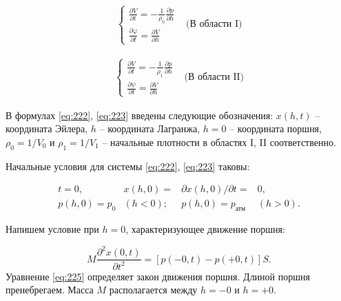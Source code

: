 \documentclass[specialist, subf, href, colorlinks=true, 14pt, final]{disser}
\theoremstyle{definition}
\newcommand{\pdfrac}[2]{\frac{\partial #1}{\partial #2}}
\begin{document}
\addtocounter{equation}{1}
\begin{equation}\label{eq:222}
  \begin{array}{lr}
  \begin{cases}
    \displaystyle \pdfrac{V}{t} = \displaystyle -\frac{1}{\rho_0} \pdfrac{p}{h} \\
    \displaystyle \pdfrac{\varphi}{t} = \displaystyle \pdfrac{V}{h}
  \end{cases}
  &
  \text{(В области I)}
  \end{array}
  \tag{2}
\end{equation}
\addtocounter{equation}{1}
\begin{equation}\label{eq:223}
  \begin{array}{lr}
  \begin{cases}
    \displaystyle \pdfrac{V}{t} = \displaystyle -\frac{1}{\rho_1} \pdfrac{p}{h} \\
    \displaystyle \pdfrac{\psi}{t} = \displaystyle \pdfrac{V}{h}
  \end{cases}
  &
  \text{(В области II)}
  \end{array}
  \tag{3}
\end{equation}


В формулах \eqref{eq:222}, \eqref{eq:223} введены следующие обозначения: $x(h, t)$ -- координата Эйлера, $h$ -- координата Лагранжа, $h=0$ -- координата поршня, $\rho_{0} = 1/V_{0}$ и $\rho_{1} = 1/V_{1}$ -- начальные плотности в областях I, II соответственно.

Начальные условия для системы \eqref{eq:222}, \eqref{eq:223} таковы:
\addtocounter{equation}{1}
\begin{equation}\label{eq:224}
	\begin{array}{llll}
  		t = 0, & x(h,0) = & \partial x (h, 0)/ \partial t = & 0, \\
  		p(h,0) =  p_0 & (h < 0) ; & p(h,0) =  p_{\text{атм}} &(h > 0).
  \end{array}
  \tag{4}
\end{equation}

Напишем условие при $h=0$, характеризующее движение поршня:
\addtocounter{equation}{1}
\begin{equation}\label{eq:225}
  M \frac{\partial ^2 x (0,t)}{\partial t^2} = \left[p(-0,t) - p(+0,t)\right] S .
  \tag{5}
\end{equation}
Уравнение \eqref{eq:225} определяет закон движения поршня. Длиной поршня пренебрегаем. Масса $M$ располагается между $h = -0$ и $h = +0$.
\end{document}
